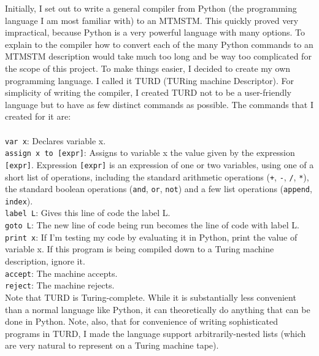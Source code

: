 \documentclass{article}
\begin{document}
Initially, I set out to write a general compiler from Python (the programming language I am most familiar with) to an MTMSTM. This quickly proved very impractical, because Python is a very powerful language with many options. To explain to the compiler how to convert each of the many Python commands to an MTMSTM description would take much too long and be way too complicated for the scope of this project. To make things easier, I decided to create my own programming language. I called it TURD (TURing machine Descriptor). For simplicity of writing the compiler, I created TURD not to be a user-friendly language but to have as few distinct commands as possible. The commands that I created for it are: \\ \\
\texttt{var x}: Declares variable x. \\
\texttt{assign x to [expr]}: Assigns to variable x the value given by the expression \texttt{[expr]}. Expression \texttt{[expr]} is an expression of one or two variables, using one of a short list of operations, including the standard arithmetic operations (\texttt{+}, \texttt{-}, \texttt{/}, \texttt{*}), the standard boolean operations (\texttt{and}, \texttt{or}, \texttt{not}) and a few list operations (\texttt{append}, \texttt{index}). \\
\texttt{label L}: Gives this line of code the label L. \\
\texttt{goto L}: The new line of code being run becomes the line of code with label L. \\
\texttt{print x}: If I'm testing my code by evaluating it in Python, print the value of variable x. If this program is being compiled down to a Turing machine description, ignore it. \\
\texttt{accept}: The machine accepts. \\
\texttt{reject}: The machine rejects. \\

Note that TURD is Turing-complete. While it is substantially less convenient than a normal language like Python, it can theoretically do anything that can be done in Python. Note, also, that for convenience of writing sophisticated programs in TURD, I made the language support arbitrarily-nested lists (which are very natural to represent on a Turing machine tape). \\
\end{document}

